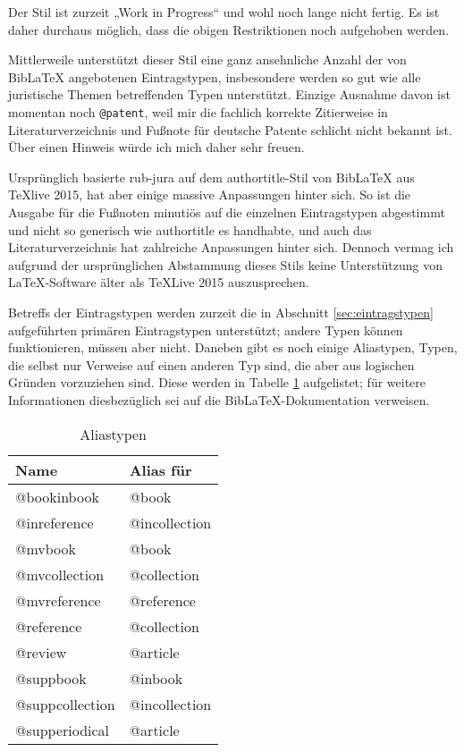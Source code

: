 \documentclass[11pt,a4paper,DIV=calc]{scrartcl}
\newcommand\software[1]{\textsf{#1}}
\newcommand\Biblatex{\software{Bib\LaTeX{}}\xspace}
\begin{document}
Der Stil ist zurzeit „Work in Progress“ und wohl noch lange nicht
fertig. Es ist daher durchaus möglich, dass die obigen Restriktionen
noch aufgehoben werden.

Mittlerweile unterstützt dieser Stil eine ganz ansehnliche Anzahl der
von \Biblatex angebotenen Eintragstypen, insbesondere werden so gut
wie alle juristische Themen betreffenden Typen unterstützt. Einzige
Ausnahme davon ist momentan noch \verb+@patent+, weil mir die fachlich
korrekte Zitierweise in Literaturverzeichnis und Fußnote für deutsche
Patente schlicht nicht bekannt ist. Über einen Hinweis würde ich mich
daher sehr freuen.

Ursprünglich basierte \software{rub-jura} auf dem
\software{authortitle}-Stil von \Biblatex aus \TeX{}live 2015, hat
aber einige massive Anpassungen hinter sich. So ist die Ausgabe für
die Fußnoten minutiös auf die einzelnen Eintragstypen abgestimmt und
nicht so generisch wie \software{authortitle} es handhabte, und auch
das Literaturverzeichnis hat zahlreiche Anpassungen hinter
sich. Dennoch vermag ich aufgrund der ursprünglichen Abstammung dieses
Stils keine Unterstützung von \LaTeX-Software älter als \TeX{}Live
2015 auszusprechen.

Betreffs der Eintragstypen werden zurzeit die in Abschnitt
\ref{sec:eintragstypen} aufgeführten primären Eintragstypen
unterstützt; andere Typen können funktionieren, müssen aber
nicht. Daneben gibt es noch einige Aliastypen, \dh Typen, die selbst
nur Verweise auf einen anderen Typ sind, die aber aus logischen
Gründen vorzuziehen sind. Diese werden in Tabelle \ref{tab:aliastypen}
aufgelistet; für weitere Informationen diesbezüglich sei auf die
\Biblatex-Do\-ku\-men\-ta\-tion verweisen.

\begin{table}
  \centering
  \begin{tabular}{ll}
    \textbf{Name} & \textbf{Alias für}\\
    \hline
    @bookinbook     & @book\\
    @inreference    & @incollection\\
    @mvbook         & @book\\
    @mvcollection   & @collection\\
    @mvreference    & @reference\\
    @reference      & @collection\\
    @review         & @article\\
    @suppbook       & @inbook\\
    @suppcollection & @incollection\\
    @supperiodical  & @article
  \end{tabular}
  \caption{Aliastypen}
  \label{tab:aliastypen}
\end{table}
\end{document}
